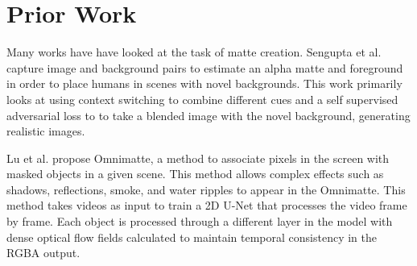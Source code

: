 \documentclass{article}
\begin{document}




\section{Prior Work}
Many works have have looked at the task of matte creation. Sengupta et al. \cite{BMSengupta20} capture image and background pairs to estimate an alpha matte and foreground in order to place humans in scenes with novel backgrounds. This work primarily looks at using context switching to combine different cues and a self supervised adversarial loss to to take a blended image with the novel background, generating realistic images.

Lu et al. \cite{lu2021} propose Omnimatte, a method to associate pixels in the screen with masked objects in a given scene. This method allows complex effects such as shadows, reflections, smoke, and water ripples to appear in the Omnimatte. This method takes videos as input to train a 2D U-Net that processes the video frame by frame. Each object is processed through a different layer in the model with dense optical flow fields calculated to maintain temporal consistency in the RGBA output.
\end{document}
